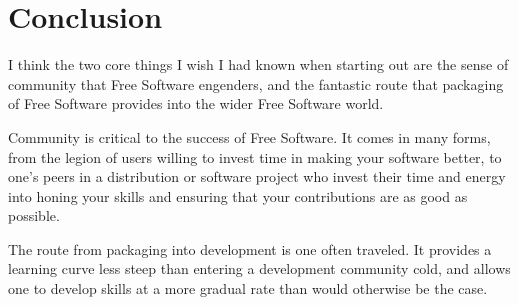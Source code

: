 \section*{Conclusion}
I think the two core things I wish I had known when starting out are the sense
of community that Free Software engenders, and the fantastic route that
packaging of Free Software provides into the wider Free Software world. 

Community is critical to the success of Free Software. It comes in many forms,
from the legion of users willing to invest time in making your software better,
to one’s peers in a distribution or software project who invest their time and
energy into honing your skills and ensuring that your contributions are as good
as possible. 

The route from packaging into development is one often traveled. It provides a
learning curve less steep than entering a development community cold, and allows
one to develop skills at a more gradual rate than would otherwise be the case.  
